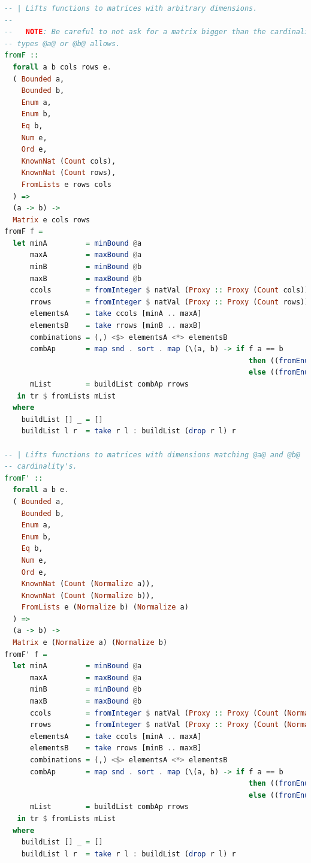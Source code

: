 \documentclass[
  oneside,
  11pt, a4paper,
  footinclude=true,
  headinclude=true,
  cleardoublepage=empty
]{scrbook}
\theoremstyle{definition}
\theoremstyle{definition}
\begin{document}
\begin{lstlisting}[language=Haskell, caption={Type safe inductive matrix library},captionpos=b]
-- | Lifts functions to matrices with arbitrary dimensions.
--
--   NOTE: Be careful to not ask for a matrix bigger than the cardinality of
-- types @a@ or @b@ allows.
fromF ::
  forall a b cols rows e.
  ( Bounded a,
    Bounded b,
    Enum a,
    Enum b,
    Eq b,
    Num e,
    Ord e,
    KnownNat (Count cols),
    KnownNat (Count rows),
    FromLists e rows cols
  ) =>
  (a -> b) ->
  Matrix e cols rows
fromF f =
  let minA         = minBound @a
      maxA         = maxBound @a
      minB         = minBound @b
      maxB         = maxBound @b
      ccols        = fromInteger $ natVal (Proxy :: Proxy (Count cols))
      rrows        = fromInteger $ natVal (Proxy :: Proxy (Count rows))
      elementsA    = take ccols [minA .. maxA]
      elementsB    = take rrows [minB .. maxB]
      combinations = (,) <$> elementsA <*> elementsB
      combAp       = map snd . sort . map (\(a, b) -> if f a == b 
                                                         then ((fromEnum a, fromEnum b), 1) 
                                                         else ((fromEnum a, fromEnum b), 0)) $ combinations
      mList        = buildList combAp rrows
   in tr $ fromLists mList
  where
    buildList [] _ = []
    buildList l r  = take r l : buildList (drop r l) r

-- | Lifts functions to matrices with dimensions matching @a@ and @b@
-- cardinality's.
fromF' ::
  forall a b e.
  ( Bounded a,
    Bounded b,
    Enum a,
    Enum b,
    Eq b,
    Num e,
    Ord e,
    KnownNat (Count (Normalize a)),
    KnownNat (Count (Normalize b)),
    FromLists e (Normalize b) (Normalize a)
  ) =>
  (a -> b) ->
  Matrix e (Normalize a) (Normalize b)
fromF' f =
  let minA         = minBound @a
      maxA         = maxBound @a
      minB         = minBound @b
      maxB         = maxBound @b
      ccols        = fromInteger $ natVal (Proxy :: Proxy (Count (Normalize a)))
      rrows        = fromInteger $ natVal (Proxy :: Proxy (Count (Normalize b)))
      elementsA    = take ccols [minA .. maxA]
      elementsB    = take rrows [minB .. maxB]
      combinations = (,) <$> elementsA <*> elementsB
      combAp       = map snd . sort . map (\(a, b) -> if f a == b 
                                                         then ((fromEnum a, fromEnum b), 1) 
                                                         else ((fromEnum a, fromEnum b), 0)) $ combinations
      mList        = buildList combAp rrows
   in tr $ fromLists mList
  where
    buildList [] _ = []
    buildList l r  = take r l : buildList (drop r l) r


\end{lstlisting}
\end{document}
